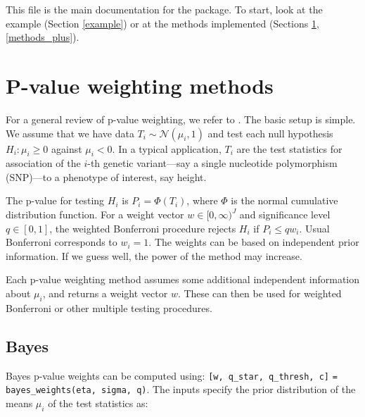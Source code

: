 \documentclass[english,11pt]{article} %
\begin{document}
This file is the main documentation for the package. To start, look at the example (Section \ref{example}) or at the methods implemented (Sections \ref{methods}, \ref{methods_plus}).

%
%

\section{P-value weighting methods}
\label{methods}

For a general review of p-value weighting, we refer to \cite{roeder2009genome, gui2012weighted}. The basic setup is simple. We assume that we have data $T_i \sim \mathcal{N}(\mu_i, 1)$ and test each null hypothesis $H_i: \mu_i \ge 0$ against $\mu_i <0$.  In a typical application, $T_i$ are the test statistics for association of the $i$-th genetic variant---say a single nucleotide polymorphism (SNP)---to a phenotype of interest, say height. 

The p-value for testing $H_i$ is $P_i = \Phi(T_i)$, where $\Phi$ is the normal cumulative distribution function.  For a weight vector $w \in [0,\infty)^{J}$ and significance level $q \in [0,1]$, the weighted Bonferroni procedure rejects $H_{i}$ if $P_i \le q w_i$. Usual Bonferroni corresponds to $w_i=1$. The weights can be based on independent prior information. If we guess well, the power of the method may increase. 

Each p-value weighting method assumes some additional independent information about $\mu_i$, and returns a weight vector $w$. These can then be used for weighted Bonferroni or other multiple testing procedures.

\subsection{Bayes}


Bayes p-value weights can be computed using:  \verb+[w, q_star, q_thresh, c]+ \verb+= bayes_weights(eta, sigma, q)+. The inputs specify the prior distribution of the means $\mu_i $ of the test statistics as:
\end{document}
